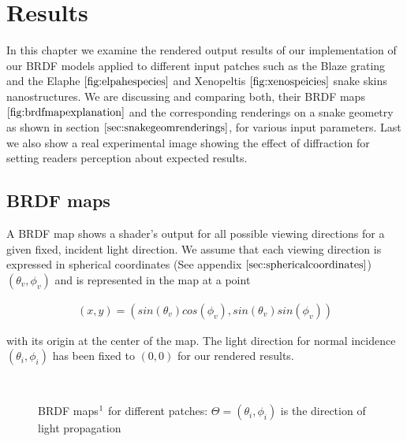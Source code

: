 \chapter{Results}
In this chapter we examine the rendered output results of our implementation of our BRDF models applied to different input patches such as the Blaze grating and the Elaphe $\ref{fig:elpahespecies}$ and Xenopeltis $\ref{fig:xenospeicies}$ snake skins nanostructures. We are discussing and comparing both, their BRDF maps $\ref{fig:brdfmapexplanation}$ and the corresponding renderings on a snake geometry as shown in section $\ref{sec:snakegeomrenderings}$, for various input parameters. Last we also show a real experimental image showing the effect of diffraction for setting readers perception about expected results.

\section{BRDF maps}
A BRDF map shows a shader's output for all possible viewing directions for a given fixed, incident light direction. We assume that each viewing direction is expressed in spherical coordinates (See appendix $\ref{sec:sphericalcoordinates}$) $(\theta_v, \phi_v)$ and is represented in the map at a point 

\begin{align}
(x,y) = (sin(\theta_v)cos(\phi_v), sin(\theta_v)sin(\phi_v))
\end{align}

with its origin at the center of the map. The light direction for normal incidence $(\theta_i, \phi_i)$ has been fixed to $(0,0)$ for our rendered results.

\begin{figure}[H]
  \centering
~
~

\caption[BRDF Map]{BRDF maps$\footnotemark$ for different patches: $\Theta=(\theta_i,\phi_i)$ is the direction of light propagation}
\label{fig:brdfmapexplanation}
\end{figure}

